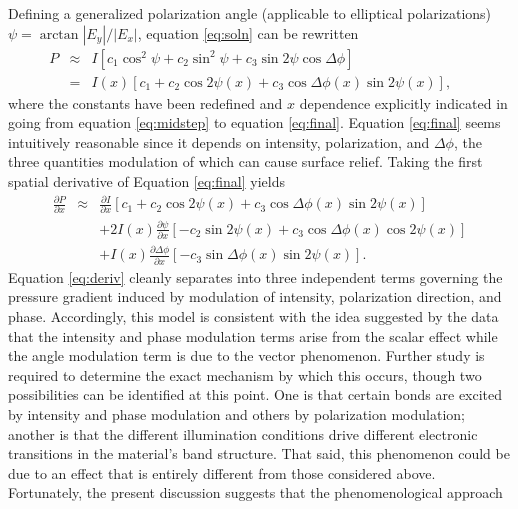 \documentclass[twocolumn,showpacs,preprintnumbers,amsmath,amssymb]{revtex4}
\begin{document}
Defining a generalized polarization angle (applicable to elliptical polarizations)
$\psi=\arctan\left|E_y\right|/\left|E_x\right|$, equation \ref{eq:soln} can be rewritten
\begin{eqnarray}
P & \approx & I\left[c_1\cos^2\psi+c_2\sin^2\psi+c_3\sin2\psi\cos\Delta\phi\right] \ \ \ \ \ \label{eq:midstep}\\
& = & I(x)\left[c_1+c_2\cos2\psi(x)+c_3\cos\Delta\phi(x)\sin2\psi(x)\right]\mathrm{,} \ \
\ \ \ \  \label{eq:final}
\end{eqnarray}
where the constants have been redefined and $x$ dependence explicitly indicated in going
from equation \ref{eq:midstep} to equation \ref{eq:final}. Equation \ref{eq:final} seems
intuitively reasonable since it depends on intensity, polarization, and $\Delta\phi$, the
three quantities modulation of which can cause surface relief. Taking the first spatial
derivative of Equation \ref{eq:final} yields
\begin{eqnarray}
\frac{\partial P}{\partial x}& \approx &\frac{\partial I}{\partial x}\left[c_1+c_2\cos2\psi(x)+c_3\cos\Delta\phi(x)\sin2\psi(x)\right] \nonumber\\
&&+2I(x)\frac{\partial \psi}{\partial x} \left[-c_2\sin2\psi(x)+c_3\cos\Delta\phi(x)\cos2\psi(x)\right] \nonumber\\
&&+I(x)\frac{\partial \Delta\phi}{\partial x}
\left[-c_3\sin\Delta\phi(x)\sin2\psi(x)\right] \mathrm{.} \label{eq:deriv}
\end{eqnarray}
Equation \ref{eq:deriv} cleanly separates into three independent terms governing the
pressure gradient induced by modulation of intensity, polarization direction, and phase.
Accordingly, this model is consistent with the idea suggested by the data that the
intensity and phase modulation terms arise from the scalar effect while the angle
modulation term is due to the vector phenomenon. Further study is required to determine
the exact mechanism by which this occurs, though two possibilities can be identified at
this point. One is that certain bonds are excited by intensity and phase modulation and
others by polarization modulation; another is that the different illumination conditions
drive different electronic transitions in the material's band structure. That said, this
phenomenon could be due to an effect that is entirely different from those considered
above. Fortunately, the present discussion suggests that the phenomenological approach
\end{document}
